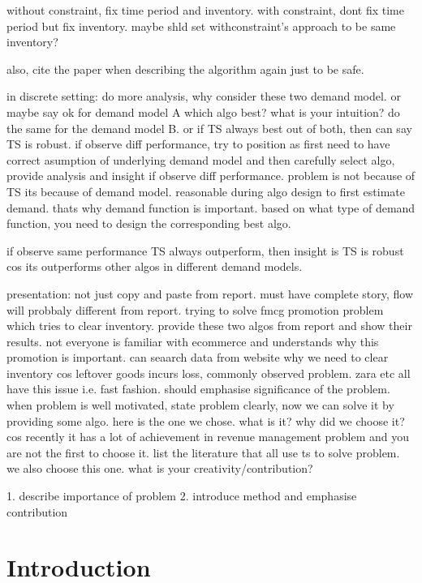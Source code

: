 \documentclass[a4paper]{article}
\begin{document}
	without constraint, fix time period and inventory. with constraint, dont fix time period but fix inventory. maybe shld set withconstraint's approach to be same inventory? 
	
	also, cite the paper when describing the algorithm again just to be safe. 
	
	in discrete setting: do more analysis, why consider these two demand model. or maybe say ok for demand model A which algo best? what is your intuition? do the same for the demand model B. or if TS always best out of both, then can say TS is robust. if observe diff performance, try to position as first need to have correct asumption of underlying demand model and then carefully select algo, provide analysis and insight if observe diff performance. problem is not because of TS its because of demand model. reasonable during algo design to first estimate demand. thats why demand function is important. based on what type of demand function, you need to design the corresponding best algo. 
	
	if observe same performance TS always outperform, then insight is TS is robust cos its outperforms other algos in different demand models.  
	
	presentation: not just copy and paste from report. must have complete story, flow will probbaly different from report. trying to solve fmcg promotion problem which tries to clear inventory. provide these two algos from report and show their results. not everyone is familiar with ecommerce and understands why this promotion is important. can seaarch data from website why we need to clear inventory cos leftover goods incurs loss, commonly observed problem. zara etc all have this issue i.e. fast fashion. should emphasise significance of the problem. when problem is well motivated, state problem clearly, now we can solve it by providing some algo. here is the one we chose. what is it? why did we choose it? cos recently it has a lot of achievement in revenue management problem and you are not the first to choose it. list the literature that all use ts to solve problem. we also choose this one. what is your creativity/contribution? 
	
	1. describe importance of problem
	2. introduce method and emphasise contribution
\pagebreak
\large
\tableofcontents



\pagebreak
\section{Introduction}
\end{document}
